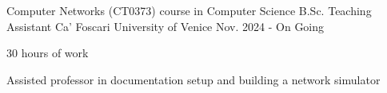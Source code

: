 
\begin{cventries}

    \cventry
        {Computer Networks (CT0373) course in Computer Science B.Sc.} %
        {Teaching Assistant} %
        {Ca' Foscari University of Venice} %
        {Nov. 2024 - On Going} %
        {
                \begin{cvitems} %
                        \item {30 hours of work}
                        \item {Assisted professor in documentation setup and building a network simulator}
                \end{cvitems}
        }
\end{cventries}